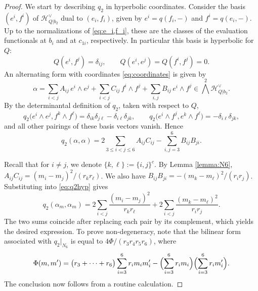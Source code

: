 \documentclass[11pt]{amsart}
\theoremstyle{definition}
\def\cH{\mathcal{H}}
\begin{document}
\begin{proof}
We start by describing $q_2$ in hyperbolic coordinates. Consider the basis $(e^i,f^i)$ of $\cH_{Q|b_2}^\vee$ dual to $(e_i,f_i)$, given by $e^i=q(f_i, -)$ and $f^i=q(e_i, -)$. Up to the normalizations of \eqref{eq:e_i,f_i}, these are the classes of the evaluation functionals at $b_i$ and at $c_{1i}$, respectively. In particular this basis is hyperbolic for $Q$:
\[
Q(e^i,f^j)=\delta_{ij},\qquad Q(e^i,e^j)=Q(f^i,f^j)=0.
\]
An alternating form with coordinates \eqref{eq:coordinates} is given by 
\[
\alpha=\sum_{i<j}A_{ij}\,e^i\wedge e^j+\sum_{i<j}C_{ij}\,f^i\wedge f^j+\sum_{i,j}B_{ij}\,e^i\wedge f^j\in \bigwedge^2 \cH_{Q|b_2}^{\vee}.
\]
By the determinantal definition of $q_2$, taken with respect to $Q$,
\[
q_2\bigl(e^i\wedge e^j,f^k\wedge f^\ell\bigr)=\delta_{ik}\delta_{j\ell}-\delta_{i\ell}\delta_{jk},\qquad q_2\bigl(e^i\wedge f^j,e^k\wedge f^\ell\bigr)=-\delta_{i\ell}\delta_{jk},
\]
and all other pairings of these basis vectors vanish. Hence
\begin{equation}\label{eq:q2hyp}
q_2(\alpha,\alpha)=2\sum_{3\le i<j\le 6}A_{ij}C_{ij}-\sum_{i,j=3}^{6}B_{ij}B_{ji}.
\end{equation}

Recall that  for $i\neq j$, we denote $\{k,\ell\}:=\{i,j\}^c$. By Lemma \ref{lemma:N6}, $A_{ij}C_{ij}=(m_i-m_j)^2/(r_kr_\ell)$. We also have $B_{ij}B_{ji}=-(m_k-m_\ell)^2/(r_ir_j)$. Substituting into \eqref{eq:q2hyp} gives
\[
q_2(\alpha_m,\alpha_m)=2\sum_{i<j}\frac{(m_i-m_j)^2}{r_kr_\ell}+2\sum_{i<j}\frac{(m_k-m_\ell)^2}{r_ir_j}.
\]
The two sums coincide after replacing each pair by its complement, which yields the desired expression. To prove non-degeneracy, note that the bilinear form associated with $q_2|_{N_6}$ is equal to $4\Phi/(r_3r_4r_5r_6)$, where
\[
\Phi(m,m')=\bigl(r_3+\cdots+r_6\bigr)\sum_{i=3}^6 r_im_im'_i-\Bigl(\sum_{i=3}^6 r_im_i\Bigr)\Bigl(\sum_{i=3}^6 r_im'_i\Bigr).
\]
The conclusion now follows from a routine calculation.
\end{proof}
\end{document}
